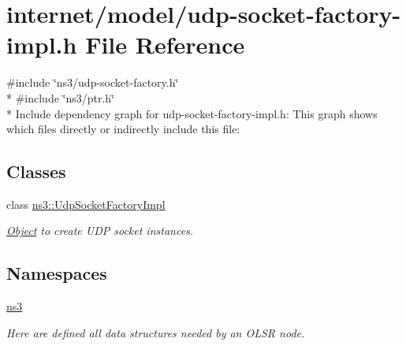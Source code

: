 \hypertarget{udp-socket-factory-impl_8h}{}\section{internet/model/udp-\/socket-\/factory-\/impl.h File Reference}
\label{udp-socket-factory-impl_8h}
{\ttfamily \#include \char`\"{}ns3/udp-\/socket-\/factory.\+h\char`\"{}}\\*
{\ttfamily \#include \char`\"{}ns3/ptr.\+h\char`\"{}}\\*
Include dependency graph for udp-\/socket-\/factory-\/impl.h\+:
This graph shows which files directly or indirectly include this file\+:
\subsection*{Classes}
\begin{DoxyCompactItemize}
\item 
class \hyperlink{classns3_1_1UdpSocketFactoryImpl}{ns3\+::\+Udp\+Socket\+Factory\+Impl}
\begin{DoxyCompactList}\small\item\em \hyperlink{classns3_1_1Object}{Object} to create U\+DP socket instances. \end{DoxyCompactList}\end{DoxyCompactItemize}
\subsection*{Namespaces}
\begin{DoxyCompactItemize}
\item 
 \hyperlink{namespacens3}{ns3}
\begin{DoxyCompactList}\small\item\em Here are defined all data structures needed by an O\+L\+SR node. \end{DoxyCompactList}\end{DoxyCompactItemize}
